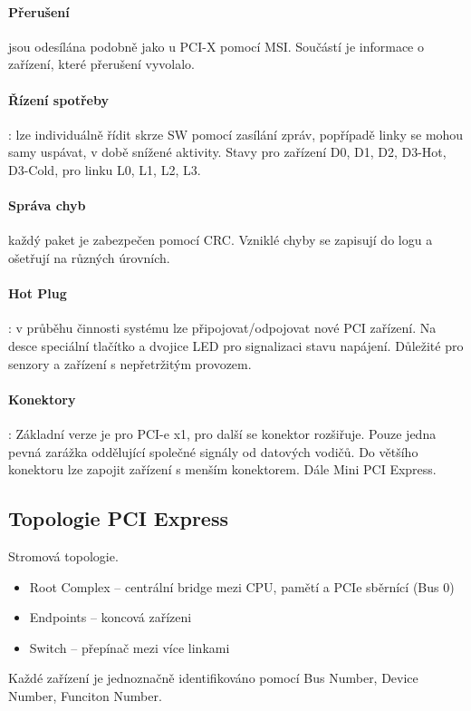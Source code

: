 \documentclass[a4paper, 11pt]{report}
\begin{document}
\paragraph{Přerušení} jsou odesílána podobně jako u PCI-X pomocí MSI. Součástí je informace o zařízení, které přerušení vyvolalo.

\paragraph{Řízení spotřeby}: lze individuálně řídit skrze SW pomocí zasílání zpráv, popřípadě linky se mohou samy uspávat, v době snížené aktivity. Stavy pro zařízení D0, D1, D2, D3-Hot, D3-Cold, pro linku L0, L1, L2, L3.

\paragraph{Správa chyb} každý paket je zabezpečen pomocí CRC. Vzniklé chyby se zapisují do logu a ošetřují na různých úrovních.

\paragraph{Hot Plug}: v průběhu činnosti systému lze připojovat/odpojovat nové PCI zařízení. Na desce speciální tlačítko a dvojice LED pro signalizaci stavu napájení. Důležité pro senzory a zařízení s nepřetržitým provozem.

\paragraph{Konektory}: Základní verze je pro PCI-e x1, pro další se konektor rozšiřuje. Pouze jedna pevná zarážka oddělující společné signály od datových vodičů. Do většího konektoru lze zapojit zařízení s menším konektorem. Dále Mini PCI Express.

\subsection{Topologie PCI Express}
Stromová topologie.
\begin{itemize}
	\item Root Complex -- centrální bridge mezi CPU, pamětí a PCIe sběrnící (Bus 0)
	\item Endpoints -- koncová zařízeni
	\item Switch -- přepínač mezi více linkami
\end{itemize}
Každé zařízení je jednoznačně identifikováno pomocí Bus Number, Device Number, Funciton Number.
\end{document}
